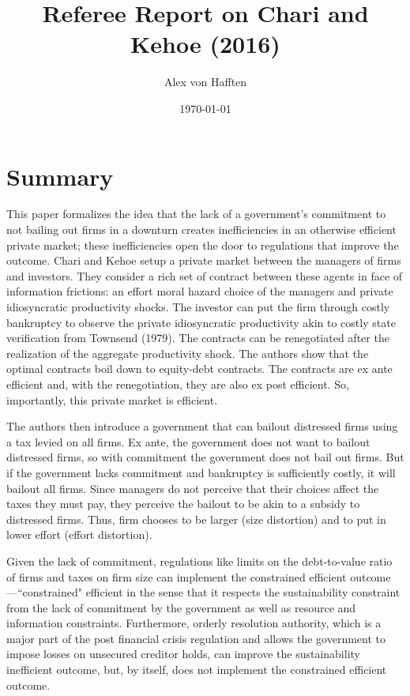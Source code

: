 \documentclass{article}
\title{Referee Report on Chari and Kehoe (2016)}
\author{Alex von Hafften}
\date{\today}
\begin{document}
\maketitle

\section{Summary}

This paper formalizes the idea that the lack of a government's commitment to not bailing out firms in a downturn creates inefficiencies in an otherwise efficient private market; these inefficiencies open the door to regulations that improve the outcome.  Chari and Kehoe setup a private market between the managers of firms and investors.  They consider a rich set of contract between these agents in face of information frictions: an effort moral hazard choice of the managers and private idiosyncratic productivity shocks.  The investor can put the firm through costly bankruptcy to observe the private idiosyncratic productivity akin to costly state verification from Townsend (1979). The contracts can be renegotiated after the realization of the aggregate productivity shock. The authors show that the optimal contracts boil down to equity-debt contracts.  The contracts are ex ante efficient and, with the renegotiation, they are also ex post efficient.  So, importantly, this private market is efficient.

\bigskip

The authors then introduce a government that can bailout distressed firms using a tax levied on all firms.  Ex ante, the government does not want to bailout distressed firms, so with commitment the government does not bail out firms. But if the government lacks commitment and bankruptcy is sufficiently costly, it will bailout all firms. Since managers do not perceive that their choices affect the taxes they must pay, they perceive the bailout to be akin to a subsidy to distressed firms. Thus, firm chooses to be larger (size distortion) and to put in lower effort (effort distortion).

\bigskip

Given the lack of commitment, regulations like limits on the debt-to-value ratio of firms and taxes on firm size can implement the constrained efficient outcome---``constrained" efficient in the sense that it respects the sustainability constraint from the lack of commitment by the government as well as resource and information constraints. Furthermore, orderly resolution authority, which is a major part of the post financial crisis regulation and allows the government to impose losses on unsecured creditor holds, can improve the sustainability inefficient outcome, but, by itself, does not implement the constrained efficient outcome.
\end{document}
